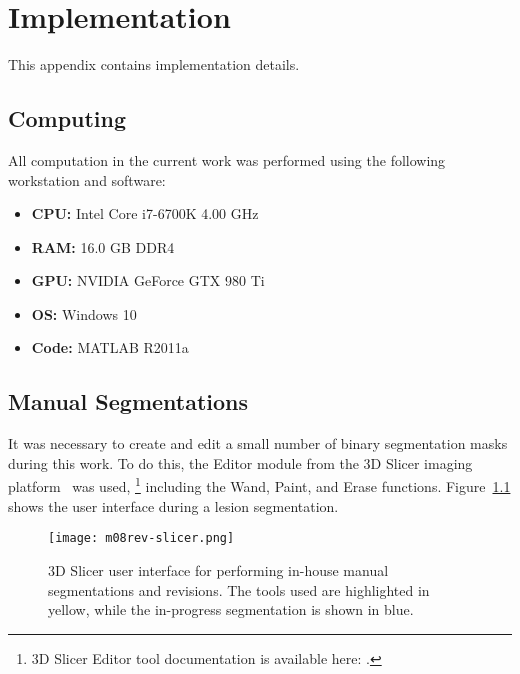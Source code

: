 \chapter{Implementation}
This appendix contains implementation details.
\section{Computing}
All computation in the current work was performed using the following workstation and software:
\begin{itemize}[topsep=0pt,itemsep=-6pt]
  \item \textbf{CPU:} Intel Core i7-6700K 4.00 GHz
  \item \textbf{RAM:} 16.0 GB DDR4
  \item \textbf{GPU:} NVIDIA GeForce GTX 980 Ti
  \item \textbf{OS:} Windows 10
  \item \textbf{Code:} MATLAB R2011a
\end{itemize}
\section{Manual Segmentations}
It was necessary to create and edit a small number of binary segmentation masks during this work.
To do this, the Editor module from the 3D Slicer imaging platform~\cite{Fedorov2012} was used,%
\footnote{3D Slicer Editor tool documentation is available here:
  .}
including the Wand, Paint, and Erase functions.
Figure~\ref{fig:m08-rev-slicer} shows the user interface during a lesion segmentation.
\begin{figure}[h]
  \centering
  \texttt{[image: m08rev-slicer.png]}
  \caption{3D Slicer user interface for performing in-house manual segmentations and revisions.
    The tools used are highlighted in yellow, while the in-progress segmentation is shown in blue.}%
  \label{fig:m08-rev-slicer}
\end{figure}
